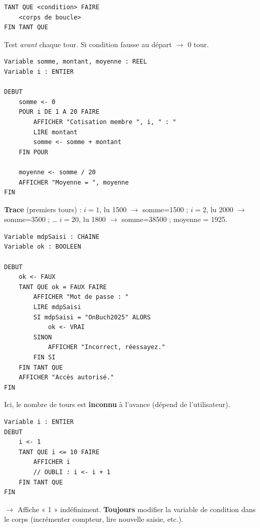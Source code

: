 \documentclass[11pt]{article}
\begin{document}
\begin{propriete}
\begin{lstlisting}
TANT QUE <condition> FAIRE
    <corps de boucle>
FIN TANT QUE
\end{lstlisting}
Test \emph{avant} chaque tour. Si condition fausse au départ $\rightarrow$ 0 tour.
\end{propriete}

\begin{exemplebox}
\begin{lstlisting}
Variable somme, montant, moyenne : REEL
Variable i : ENTIER

DEBUT
    somme <- 0
    POUR i DE 1 A 20 FAIRE
        AFFICHER "Cotisation membre ", i, " : "
        LIRE montant
        somme <- somme + montant
    FIN POUR

    moyenne <- somme / 20
    AFFICHER "Moyenne = ", moyenne
FIN
\end{lstlisting}
\textbf{Trace} (premiers tours) : $i=1$, lu 1500 $\rightarrow$ somme=1500 ; $i=2$, lu 2000 $\rightarrow$ somme=3500 ; … $i=20$, lu 1800 $\rightarrow$ somme=38500 ; moyenne = 1925.
\end{exemplebox}

\begin{exemplebox}
\begin{lstlisting}
Variable mdpSaisi : CHAINE
Variable ok : BOOLEEN

DEBUT
    ok <- FAUX
    TANT QUE ok = FAUX FAIRE
        AFFICHER "Mot de passe : "
        LIRE mdpSaisi
        SI mdpSaisi = "OnBuch2025" ALORS
            ok <- VRAI
        SINON
            AFFICHER "Incorrect, réessayez."
        FIN SI
    FIN TANT QUE
    AFFICHER "Accès autorisé."
FIN
\end{lstlisting}
Ici, le nombre de tours est \textbf{inconnu} à l'avance (dépend de l'utilisateur).
\end{exemplebox}

\begin{attention}
\begin{lstlisting}
Variable i : ENTIER
DEBUT
    i <- 1
    TANT QUE i <= 10 FAIRE
        AFFICHER i
        // OUBLI : i <- i + 1
    FIN TANT QUE
FIN
\end{lstlisting}
$\rightarrow$ Affiche « 1 » indéfiniment. \textbf{Toujours} modifier la variable de condition dans le corps (incrémenter compteur, lire nouvelle saisie, etc.).
\end{attention}
\end{document}

